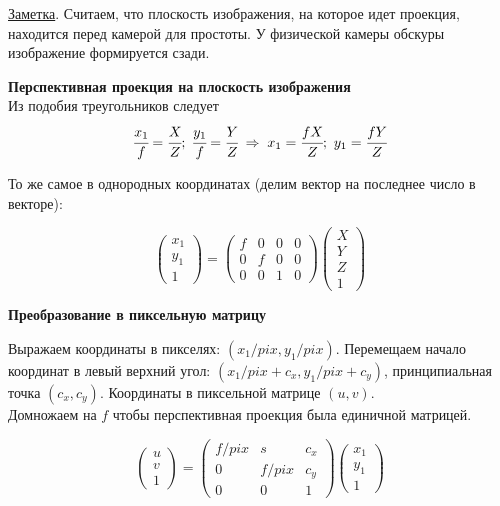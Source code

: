 \documentclass[addpoints]{exam}
\begin{document}
    \underline{Заметка}. Считаем, что плоскость изображения, на которое идет проекция, находится перед камерой для простоты. У физической камеры обскуры изображение формируется сзади.
    
    
    
    
    
    {\bf Перспективная проекция на плоскость изображения}\\
    Из подобия треугольников следует
    \[
    \cfrac{x_1}{f} = \cfrac{X}{Z};\; \cfrac{y_1}{f} = \cfrac{Y}{Z}
    \; \Rightarrow \;
    x_1 = \cfrac{fX}{Z};\ y_1=\cfrac{fY}{Z}
    \]
    
    То же самое в однородных координатах (делим вектор на последнее число в векторе):
    
    \[
    \begin{pmatrix}
    	x_1\\
    	y_1\\
    	1
    \end{pmatrix} = 
    \begin{pmatrix}
    	f & 0 & 0 & 0\\
    	0 & f & 0 & 0\\
    	0 & 0 & 1 & 0
    \end{pmatrix}
    \begin{pmatrix}
    	X\\
    	Y\\
    	Z\\
    	1
    \end{pmatrix}
    \]
    
    {\bf Преобразование в пиксельную матрицу}
    
	Выражаем координаты в пикселях: \( (x_1 / pix, y_1 / pix) \). Перемещаем начало координат в левый верхний угол: \( (x_1 / pix + c_x, y_1 / pix + c_y) \), принципиальная точка \( (c_x, c_y) \). Координаты в пиксельной матрице $(u, v)$.\\
	Домножаем на $f$ чтобы перспективная проекция была единичной матрицей.
    
    \[
    \begin{pmatrix}
    	u\\
    	v\\
    	1
    \end{pmatrix} =
    \begin{pmatrix}
    	f/pix & s & c_x\\
    	0 & f/pix & c_y\\
    	0 & 0 & 1
    \end{pmatrix}
    \begin{pmatrix}
    	x_1\\
    	y_1\\
    	1
    \end{pmatrix}
    \]
    
\end{document}
